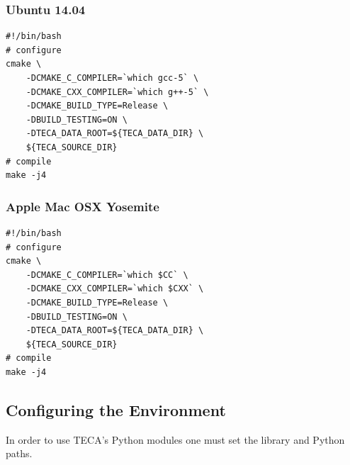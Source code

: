 \documentclass[a4paper,10pt,DIV=12]{scrreprt}
\begin{document}
\subsubsection{Ubuntu 14.04}
\vspace{2mm}\hspace{0.2in}\begin{minipage}{0.8\textwidth}
\begin{verbatim}
#!/bin/bash
# configure
cmake \
    -DCMAKE_C_COMPILER=`which gcc-5` \
    -DCMAKE_CXX_COMPILER=`which g++-5` \
    -DCMAKE_BUILD_TYPE=Release \
    -DBUILD_TESTING=ON \
    -DTECA_DATA_ROOT=${TECA_DATA_DIR} \
    ${TECA_SOURCE_DIR}
# compile
make -j4
\end{verbatim}
\end{minipage}\vspace{2mm}

\subsubsection{Apple Mac OSX Yosemite}
\vspace{2mm}\hspace{0.2in}\begin{minipage}{0.8\textwidth}
\begin{verbatim}
#!/bin/bash
# configure
cmake \
    -DCMAKE_C_COMPILER=`which $CC` \
    -DCMAKE_CXX_COMPILER=`which $CXX` \
    -DCMAKE_BUILD_TYPE=Release \
    -DBUILD_TESTING=ON \
    -DTECA_DATA_ROOT=${TECA_DATA_DIR} \
    ${TECA_SOURCE_DIR}
# compile
make -j4
\end{verbatim}
\end{minipage}\vspace{2mm}
% 
% 

\subsection{Configuring the Environment}
In order to use TECA's Python modules one must set the library and Python paths.
\end{document}
